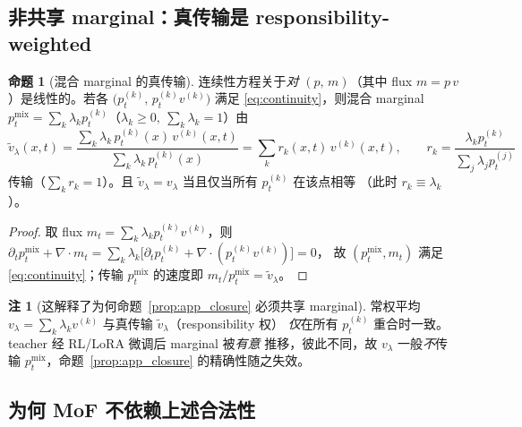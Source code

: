 \documentclass[11pt,a4paper]{article}
\theoremstyle{definition}
\newtheorem{remark}{注}
\newtheorem{proposition}{命题}
\begin{document}
\subsection{非共享 marginal：真传输是 responsibility-weighted}
\label{ssec:app_transport}

\begin{proposition}[混合 marginal 的真传输]
\label{prop:app_transport}
连续性方程关于\emph{对} $(p,\,m)$（其中 flux $m=p\,v$）是线性的。若各
$\big(p_t^{(k)},\,p_t^{(k)}v^{(k)}\big)$ 满足 \eqref{eq:continuity}，则混合 marginal
$p_t^{\mathrm{mix}}=\sum_k\lambda_k p_t^{(k)}$（$\lambda_k\ge0,\ \sum_k\lambda_k=1$）由
\begin{equation}
\tilde v_\lambda(x,t)=\frac{\sum_k\lambda_k\,p_t^{(k)}(x)\,v^{(k)}(x,t)}
{\sum_k\lambda_k\,p_t^{(k)}(x)}=\sum_k r_k(x,t)\,v^{(k)}(x,t),\qquad
r_k=\frac{\lambda_k p_t^{(k)}}{\sum_j\lambda_j p_t^{(j)}}
\label{eq:app_resp}
\end{equation}
传输（$\sum_k r_k=1$）。且 $\tilde v_\lambda=v_\lambda$ 当且仅当所有 $p_t^{(k)}$ 在该点相等
（此时 $r_k\equiv\lambda_k$）。
\end{proposition}

\begin{proof}
取 flux $m_t=\sum_k\lambda_k p_t^{(k)}v^{(k)}$，则
$\partial_t p_t^{\mathrm{mix}}+\nabla\!\cdot m_t
=\sum_k\lambda_k\big[\partial_t p_t^{(k)}+\nabla\!\cdot(p_t^{(k)}v^{(k)})\big]=0$，
故 $(p_t^{\mathrm{mix}},m_t)$ 满足 \eqref{eq:continuity}；传输 $p_t^{\mathrm{mix}}$ 的速度即
$m_t/p_t^{\mathrm{mix}}=\tilde v_\lambda$。
\end{proof}

\begin{remark}[这解释了为何命题~\ref{prop:app_closure} 必须共享 marginal]
\label{rem:app_why_shared}
常权平均 $v_\lambda=\sum_k\lambda_k v^{(k)}$ 与真传输 $\tilde v_\lambda$（responsibility 权）
\emph{仅}在所有 $p_t^{(k)}$ 重合时一致。teacher 经 RL/LoRA 微调后 marginal 被\emph{有意}
推移，彼此不同，故 $v_\lambda$ 一般\emph{不}传输 $p_t^{\mathrm{mix}}$，命题~\ref{prop:app_closure}
的精确性随之失效。
\end{remark}

\subsection{为何 MoF 不依赖上述合法性}
\label{ssec:app_wellposed}
\end{document}
